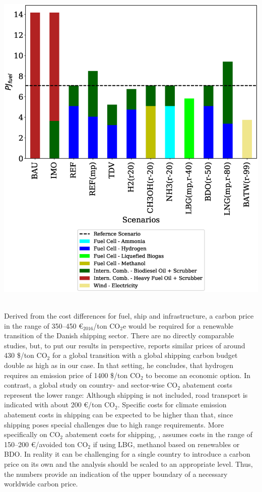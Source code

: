 \documentclass[article]{elsarticle}
\begin{document}
\begin{minipage}[t]{0.49\textwidth}
    \centering
    \captionsetup{justification=centering}
    \includegraphics[width=.95\textwidth]{figures/AllFuel2050.eps}
    \label{fig:AllFuel2050}
\end{minipage}\\ %

Derived from the cost differences for fuel, ship and infrastructure, a carbon price in the range of 350--450 \euro$_{2016}$/ton CO$_2$e would be required for a renewable transition of the Danish shipping sector. There are no directly comparable studies, but, to put our results in perspective, \citet[p.197]{Raucci2017} reports similar prices of around 430 \$/ton CO$_2$ for a global transition with a global shipping carbon budget double as high as in our case. In that setting, he concludes, that hydrogen requires an emission price of 1400 \$/ton CO$_2$ to become an economic option. In contrast, a global study on country- and sector-wise CO$_2$ abatement costs \cite{OECD2016} represent the lower range: Although shipping is not included, road transport is indicated with about 200 \euro/ton CO$_2$. Specific costs for climate emission abatement costs in shipping can be expected to be higher than that, since shipping poses special challenges due to high range requirements. More specifically on CO$_2$ abatement costs for shipping, \citet{DNVGL2017}, assumes costs in the range of 150--200 \euro/avoided ton CO$_2$ if using LBG, methanol based on renewables or BDO. In reality it can be challenging for a single country to introduce a carbon price on its own and the analysis should be scaled to an appropriate level. Thus, the numbers provide an indication of the upper boundary of a necessary worldwide carbon price.
\end{document}
